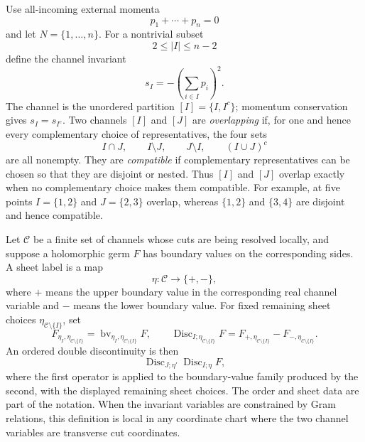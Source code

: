 \begin{definition}
\label{def:steinmann-channels-overlap-and-discontinuities}
Use all-incoming external momenta
\[
  p_1+\cdots+p_n=0
\]
and let \(N=\{1,\ldots,n\}\).  For a nontrivial subset
\[
  2\le |I|\le n-2
\]
define the channel invariant
\begin{equation}
  s_I
  =
  -\left(\sum_{i\in I}p_i\right)^2 .
  \label{eq:steinmann-channel-invariant}
\end{equation}
The channel is the unordered partition \([I]=\{I,I^c\}\); momentum
conservation gives \(s_I=s_{I^c}\).  Two channels \([I]\) and \([J]\) are
\emph{overlapping} if, for one and hence every complementary choice of
representatives, the four sets
\[
  I\cap J,\qquad I\setminus J,\qquad J\setminus I,\qquad (I\cup J)^c
\]
are all nonempty.  They are \emph{compatible} if complementary representatives
can be chosen so that they are disjoint or nested.  Thus \([I]\) and \([J]\)
overlap exactly when no complementary choice makes them compatible.  For
example, at five points \(I=\{1,2\}\) and \(J=\{2,3\}\) overlap, whereas
\(\{1,2\}\) and \(\{3,4\}\) are disjoint and hence compatible.

Let \(\mathcal C\) be a finite set of channels whose cuts are being resolved
locally, and suppose a holomorphic germ \(F\) has boundary values on the
corresponding sides.  A sheet label is a map
\[
  \eta:\mathcal C\to\{+,-\},
\]
where \(+\) means the upper boundary value in the corresponding real channel
variable and \(-\) means the lower boundary value.  For fixed remaining sheet
choices \(\eta_{\mathcal C\setminus\{I\}}\), set
\begin{equation}
  F_{\eta_I,\eta_{\mathcal C\setminus\{I\}}}
  =
  \operatorname{bv}_{\eta_I,\eta_{\mathcal C\setminus\{I\}}}F,
  \qquad
  \operatorname{Disc}_{I;\eta_{\mathcal C\setminus\{I\}}}F
  =
  F_{+,\eta_{\mathcal C\setminus\{I\}}}
  -
  F_{-,\eta_{\mathcal C\setminus\{I\}}}.
  \label{eq:steinmann-sheeted-boundary-value}
\end{equation}
An ordered double discontinuity is then
\begin{equation}
  \operatorname{Disc}_{J;\eta'}
  \operatorname{Disc}_{I;\eta}F ,
  \label{eq:steinmann-ordered-discontinuity}
\end{equation}
where the first operator is applied to the boundary-value family produced by
the second, with the displayed remaining sheet choices.  The order and sheet
data are part of the notation.  When the invariant variables are constrained by
Gram relations, this definition is local in any coordinate chart where the two
channel variables are transverse cut coordinates.
\end{definition}

